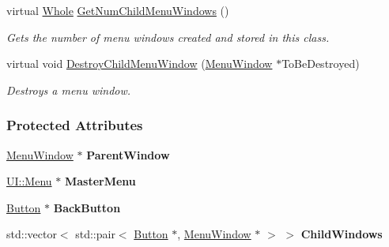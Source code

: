 \begin{DoxyCompactItemize}
virtual \hyperlink{namespacephys_a460f6bc24c8dd347b05e0366ae34f34a}{Whole} \hyperlink{classphys_1_1UI_1_1MenuWindow_ab3a6ae708ba2cea16cd0de176e265459}{GetNumChildMenuWindows} ()
\begin{DoxyCompactList}\small\item\em Gets the number of menu windows created and stored in this class. \item\end{DoxyCompactList}\item 
virtual void \hyperlink{classphys_1_1UI_1_1MenuWindow_ace2796c2d250fe1582f7c43333a7295e}{DestroyChildMenuWindow} (\hyperlink{classphys_1_1UI_1_1MenuWindow}{MenuWindow} $\ast$ToBeDestroyed)
\begin{DoxyCompactList}\small\item\em Destroys a menu window. \item\end{DoxyCompactList}\end{DoxyCompactItemize}
\subsubsection*{Protected Attributes}
\begin{DoxyCompactItemize}
\item 
\hypertarget{classphys_1_1UI_1_1MenuWindow_a94ec8861afbc6f39ac4b443a912bc0c1}{
\hyperlink{classphys_1_1UI_1_1MenuWindow}{MenuWindow} $\ast$ {\bfseries ParentWindow}}
\label{d4/d07/classphys_1_1UI_1_1MenuWindow_a94ec8861afbc6f39ac4b443a912bc0c1}

\item 
\hypertarget{classphys_1_1UI_1_1MenuWindow_adeed2fd68308846df8885febee141111}{
\hyperlink{classphys_1_1UI_1_1Menu}{UI::Menu} $\ast$ {\bfseries MasterMenu}}
\label{d4/d07/classphys_1_1UI_1_1MenuWindow_adeed2fd68308846df8885febee141111}

\item 
\hypertarget{classphys_1_1UI_1_1MenuWindow_a02826ad4a8d0b8934a7dbe86e4ea3edf}{
\hyperlink{classphys_1_1UI_1_1Button}{Button} $\ast$ {\bfseries BackButton}}
\label{d4/d07/classphys_1_1UI_1_1MenuWindow_a02826ad4a8d0b8934a7dbe86e4ea3edf}

\item 
\hypertarget{classphys_1_1UI_1_1MenuWindow_ae55c88520920e44c0bb125e812d62272}{
std::vector$<$ std::pair$<$ \hyperlink{classphys_1_1UI_1_1Button}{Button} $\ast$, \hyperlink{classphys_1_1UI_1_1MenuWindow}{MenuWindow} $\ast$ $>$ $>$ {\bfseries ChildWindows}}
\label{d4/d07/classphys_1_1UI_1_1MenuWindow_ae55c88520920e44c0bb125e812d62272}

\end{DoxyCompactItemize}


